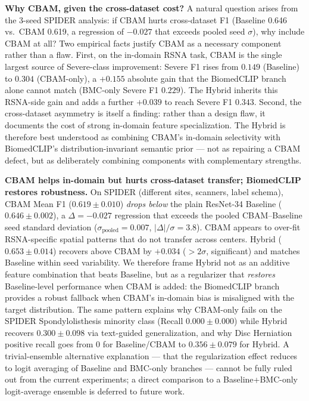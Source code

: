 \documentclass[conference]{IEEEtran}
\begin{document}
\textbf{Why CBAM, given the cross-dataset cost?} A natural question
arises from the 3-seed SPIDER analysis: if CBAM hurts cross-dataset
F1 (Baseline 0.646 vs.\ CBAM 0.619, a regression of $-0.027$ that
exceeds pooled seed $\sigma$), why include CBAM at all? Two empirical
facts justify CBAM as a necessary component rather than a flaw.
First, on the in-domain RSNA task, CBAM is the single largest source
of Severe-class improvement: Severe F1 rises from $0.149$ (Baseline) to
$0.304$ (CBAM-only), a $+0.155$ absolute gain that the BiomedCLIP
branch alone cannot match (BMC-only Severe F1 $0.229$). The Hybrid
inherits this RSNA-side gain and adds a further $+0.039$ to reach
Severe F1 $0.343$. Second, the cross-dataset asymmetry is itself a
finding: rather than a design flaw, it documents the cost of strong
in-domain feature specialization. The Hybrid is therefore best
understood as combining CBAM's in-domain selectivity with BiomedCLIP's
distribution-invariant semantic prior --- not as repairing a CBAM
defect, but as deliberately combining components with complementary
strengths.

\textbf{CBAM helps in-domain but hurts cross-dataset transfer; BiomedCLIP
restores robustness.} On SPIDER (different
sites, scanners, label schema), CBAM Mean F1 ($0.619 \pm 0.010$)
\emph{drops below} the plain ResNet-34 Baseline ($0.646 \pm 0.002$),
a $\Delta = -0.027$ regression that exceeds the pooled CBAM--Baseline
seed standard deviation ($\sigma_{\text{pooled}} = 0.007$,
$|\Delta|/\sigma = 3.8$). CBAM appears to over-fit
RSNA-specific spatial patterns that do not transfer across centers.
Hybrid ($0.653 \pm 0.014$) recovers above CBAM by $+0.034$ ($> 2\sigma$,
significant) and matches Baseline within seed variability. We
therefore frame Hybrid not as an additive feature combination that
beats Baseline, but as a regularizer that \emph{restores}
Baseline-level performance when CBAM is added: the BiomedCLIP branch
provides a robust fallback when CBAM's in-domain bias is misaligned
with the target distribution. The same pattern explains why CBAM-only
fails on the SPIDER Spondylolisthesis minority class (Recall
$0.000 \pm 0.000$) while Hybrid recovers $0.300 \pm 0.098$ via
text-guided generalization, and why Disc Herniation positive recall
goes from $0$ for Baseline/CBAM to $0.356 \pm 0.079$ for Hybrid. A
trivial-ensemble alternative explanation --- that the regularization
effect reduces to logit averaging of Baseline and BMC-only branches
--- cannot be fully ruled out from the current experiments; a direct
comparison to a Baseline+BMC-only logit-average ensemble is deferred
to future work.
\end{document}
